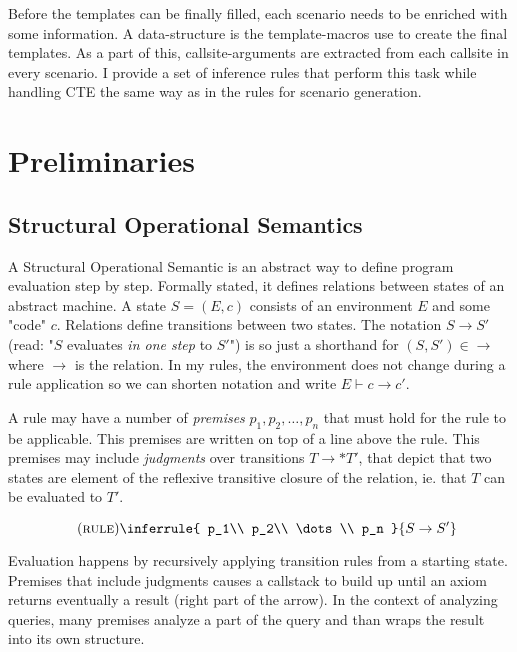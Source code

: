 Before the templates can be finally filled, each scenario needs to be enriched with some information. A data-structure is the template-macros use to create the final templates. As a part of this, callsite-arguments are extracted from each callsite in every scenario. I provide a set of inference rules that perform this task while handling CTE the same way as in the rules for scenario generation.

\section{Preliminaries}\label{approach}

\subsection{Structural Operational Semantics}

A Structural Operational Semantic is an abstract way to define program evaluation step by step. Formally stated, it defines relations between states of an abstract machine. A state $S = (E, c)$ consists of an environment $E$ and some "code" $c$. Relations define transitions between two states. The notation $S \rightarrow S'$ (read: "$S$ evaluates \textit{in one step} to $S'$") is so just a shorthand for $(S, S') \in \rightarrow$ where $\rightarrow$ is the relation. In my rules, the environment does not change during a rule application so we can shorten notation and write $E \vdash c \rightarrow c'$. \cite[Chapter 2]{semanticsWithApplications}

A rule may have a number of \textit{premises} $p_1, p_2, \dots, p_n$ that must hold for the rule to be applicable. This premises are written on top of a line above the rule. This premises may include \textit{judgments} over transitions $T \rightarrow* T'$, that depict that two states are element of the reflexive transitive closure of the relation, ie. that $T$ can be evaluated to $T'$.

$$\quad(\textsc{rule})\inferrule{
   p_1\\
   p_2\\
   \dots\\
   p_n
}{
    S \rightarrow S'
}$$

Evaluation happens by recursively applying transition rules from a starting state. Premises that include judgments causes a callstack to build up until an axiom returns eventually a result (right part of the arrow). In the context of analyzing queries, many premises analyze a part of the query and than wraps the result into its own structure.

